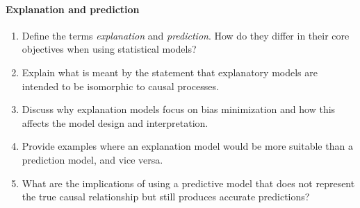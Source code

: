 \paragraph*{Explanation and prediction}
\begin{enumerate}
    \item Define the terms \emph{explanation} and \emph{prediction}. How do they differ in their core objectives when using statistical models?
    \item Explain what is meant by the statement that explanatory models are intended to be isomorphic to causal processes.
    \item Discuss why explanation models focus on bias minimization and how this affects the model design and interpretation.
    \item Provide examples where an explanation model would be more suitable than a prediction model, and vice versa.
    \item What are the implications of using a predictive model that does not represent the true causal relationship but still produces accurate predictions?
\end{enumerate}
